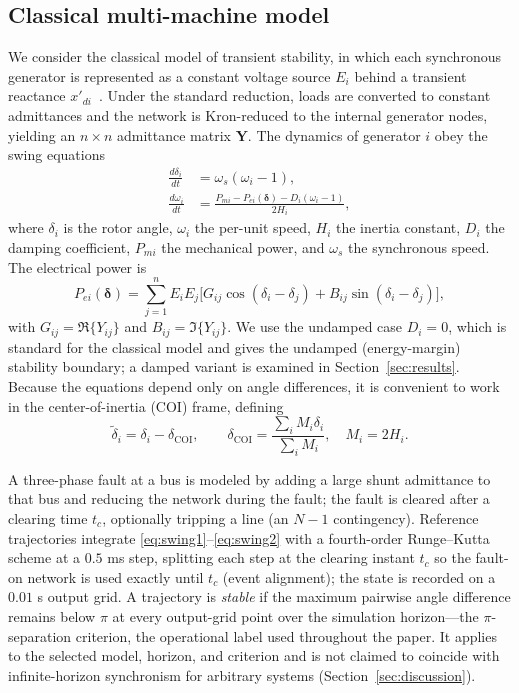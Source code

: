 \documentclass[5p,times]{elsarticle}
\begin{document}
\subsection{Classical multi-machine model}
We consider the classical model of transient stability, in which each synchronous generator is
represented as a constant voltage source $E_i$ behind a transient reactance
$x'_{di}$~\cite{sauer1998dynamics, kundur1994power}. Under the standard reduction, loads are
converted to constant admittances and the network is Kron-reduced to the internal generator
nodes, yielding an $n\times n$ admittance matrix $\bm{Y}$. The dynamics of generator $i$ obey the
swing equations
\begin{align}
\frac{d\delta_i}{dt} &= \omega_s(\omega_i - 1), \label{eq:swing1}\\
\frac{d\omega_i}{dt} &= \frac{P_{mi} - P_{ei}(\bm{\delta}) - D_i(\omega_i - 1)}{2H_i}, \label{eq:swing2}
\end{align}
where $\delta_i$ is the rotor angle, $\omega_i$ the per-unit speed, $H_i$ the inertia constant,
$D_i$ the damping coefficient, $P_{mi}$ the mechanical power, and $\omega_s$ the synchronous
speed. The electrical power is
\begin{equation}
P_{ei}(\bm{\delta}) = \sum_{j=1}^{n} E_i E_j\bigl[ G_{ij}\cos(\delta_i-\delta_j)
+ B_{ij}\sin(\delta_i-\delta_j)\bigr],
\end{equation}
with $G_{ij}=\Re\{Y_{ij}\}$ and $B_{ij}=\Im\{Y_{ij}\}$. We use the undamped case $D_i=0$, which
is standard for the classical model and gives the undamped (energy-margin) stability boundary; a
damped variant is examined in Section~\ref{sec:results}. Because the
equations depend only on angle differences, it is convenient to work in the center-of-inertia
(COI) frame, defining
\begin{equation}
\tilde\delta_i = \delta_i - \delta_{\mathrm{COI}}, \qquad
\delta_{\mathrm{COI}} = \frac{\sum_i M_i \delta_i}{\sum_i M_i}, \quad M_i = 2H_i.
\end{equation}

A three-phase fault at a bus is modeled by adding a large shunt admittance to that bus and
reducing the network during the fault; the fault is cleared after a clearing time $t_c$,
optionally tripping a line (an $N{-}1$ contingency). Reference trajectories integrate
\eqref{eq:swing1}--\eqref{eq:swing2} with a fourth-order Runge--Kutta scheme at a $0.5$ ms step,
splitting each step at the clearing instant $t_c$ so the fault-on network is used exactly until
$t_c$ (event alignment); the state is recorded on a $0.01$ s output grid. A trajectory is
\emph{stable} if the maximum pairwise angle difference remains below $\pi$ at every output-grid
point over the simulation horizon---the $\pi$-separation criterion, the operational label used
throughout the paper. It applies to the selected model, horizon, and criterion and is not claimed
to coincide with infinite-horizon synchronism for arbitrary systems
(Section~\ref{sec:discussion}).
\end{document}
